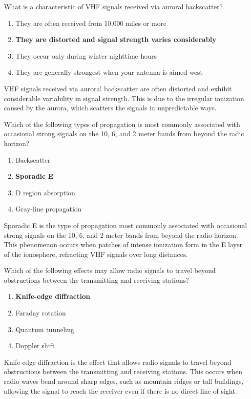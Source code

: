 \begin{tcolorbox}[colback=gray!10!white,colframe=black!75!black,title={T3C03}]
    What is a characteristic of VHF signals received via auroral backscatter?
    \begin{enumerate}[label=\Alph*),noitemsep]
        \item They are often received from 10,000 miles or more
        \item \textbf{They are distorted and signal strength varies considerably}
        \item They occur only during winter nighttime hours
        \item They are generally strongest when your antenna is aimed west
    \end{enumerate}
\end{tcolorbox}
VHF signals received via auroral backscatter are often distorted and exhibit considerable variability in signal strength. This is due to the irregular ionization caused by the aurora, which scatters the signals in unpredictable ways.

\begin{tcolorbox}[colback=gray!10!white,colframe=black!75!black,title={T3C04}]
    Which of the following types of propagation is most commonly associated with occasional strong signals on the 10, 6, and 2 meter bands from beyond the radio horizon?
    \begin{enumerate}[label=\Alph*),noitemsep]
        \item Backscatter
        \item \textbf{Sporadic E}
        \item D region absorption
        \item Gray-line propagation
    \end{enumerate}
\end{tcolorbox}
Sporadic E is the type of propagation most commonly associated with occasional strong signals on the 10, 6, and 2 meter bands from beyond the radio horizon. This phenomenon occurs when patches of intense ionization form in the E layer of the ionosphere, refracting VHF signals over long distances.

\begin{tcolorbox}[colback=gray!10!white,colframe=black!75!black,title={T3C05}]
    Which of the following effects may allow radio signals to travel beyond obstructions between the transmitting and receiving stations?
    \begin{enumerate}[label=\Alph*),noitemsep]
        \item \textbf{Knife-edge diffraction}
        \item Faraday rotation
        \item Quantum tunneling
        \item Doppler shift
    \end{enumerate}
\end{tcolorbox}
Knife-edge diffraction is the effect that allows radio signals to travel beyond obstructions between the transmitting and receiving stations. This occurs when radio waves bend around sharp edges, such as mountain ridges or tall buildings, allowing the signal to reach the receiver even if there is no direct line of sight.

